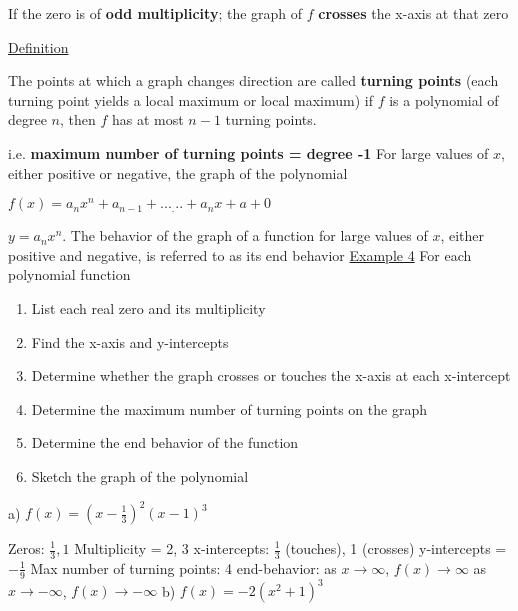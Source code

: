 \documentclass{report}
\begin{document}
  \noindent If the zero is of \textbf{odd multiplicity}; the graph of $f$ \textbf{crosses} the x-axis at that zero
  \bigbreak \bigbreak  

  \begin{Large}
  \noindent \underline{Definition}
  \end{Large}
  
  \bigbreak \noindent
  The points at which a graph changes direction are called \textbf{turning points} (each turning point yields a local maximum or local maximum)
  \bigbreak
  \noindent if $f$ is a polynomial of degree $n$, then $f$ has at most $n-1$ turning points.
  
  \noindent i.e. \textbf{maximum number of turning points = degree -1}
  \bigbreak \noindent
  For large values of $x$, either positive or negative, the graph of the polynomial

  \noindent $f(x) = a_nx^n + a_{n-1} + ..._... + a_nx + a + 0$   

  \noindent $y = a_nx^n$. The behavior of the graph of a function for large values of $x$, either positive and negative, is referred to as its end behavior
  \bigbreak \noindent \underline{Example 4} For each polynomial function
  \begin{enumerate}

    \item List each real zero and its multiplicity
    \item Find the x-axis and y-intercepts
    \item Determine whether the graph crosses or touches the x-axis at each x-intercept 
    \item Determine the maximum number of turning points on the graph
    \item Determine the end behavior of the function
    \item Sketch the graph of the polynomial

  \end{enumerate}
  \bigbreak
  \noindent a) $f(x) =(x-\frac{1}{3})^2(x-1)^3$

    Zeros: $\frac{1}{3}, 1$
    \bigbreak
    Multiplicity = 2, 3
    \bigbreak
   x-intercepts: $\frac{1}{3}$ (touches), 1 (crosses) 
    \bigbreak
   y-intercepts = $-\frac{1}{9}$
    \bigbreak
    Max number of turning points: 4
    \bigbreak
    end-behavior: as $x\to\infty$,  $f(x)\to\infty$
    as $x\to-\infty$, $f(x)\to-\infty$
    \bigbreak \bigbreak \noindent
    b) $f(x) = -2(x^2+1)^3$
\end{document}
